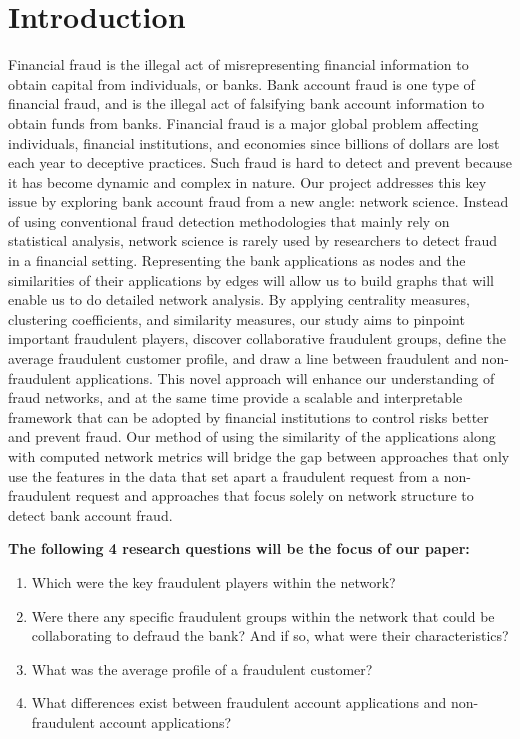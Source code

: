 \documentclass{styles/svproc}
\begin{document}
\section{Introduction}
Financial fraud is the illegal act of misrepresenting financial information to obtain capital from individuals, or banks.  Bank account fraud is one type of financial fraud, and is the illegal act of falsifying bank account information to obtain funds from banks. Financial fraud is a major global problem affecting individuals, financial institutions, and economies since billions of dollars are lost each year to deceptive practices. Such fraud is hard to detect and prevent because it has become dynamic and complex in nature. Our project addresses this key issue by exploring bank account fraud from a new angle: network science. Instead of using conventional fraud detection methodologies that mainly rely on statistical analysis, network science is rarely used by researchers to detect fraud in a financial setting. Representing the bank applications as nodes and the similarities of their applications by edges will allow us to build graphs that will enable us to do detailed network analysis. By applying centrality measures, clustering coefficients, and similarity measures, our study aims to pinpoint important fraudulent players, discover collaborative fraudulent groups, define the average fraudulent customer profile, and draw a line between fraudulent and non-fraudulent applications. This novel approach will enhance our understanding of fraud networks, and at the same time provide a scalable and interpretable framework that can be adopted by financial institutions to control risks better and prevent fraud. Our method of using the similarity of the applications along with computed network metrics will bridge the gap between approaches that only use the features in the data that set apart a fraudulent request from a non-fraudulent request and approaches that focus solely on network structure to detect bank account fraud.

\bigskip
\noindent\textbf{The following 4 research questions will be the focus of our paper:}

\begin{enumerate}
  \item Which were the key fraudulent players within the network?
  \item Were there any specific fraudulent groups within the network that could be collaborating to defraud the bank? And if so, what were their characteristics?
  \item What was the average profile of a fraudulent customer?
  \item What differences exist between fraudulent account applications and non-fraudulent account applications?
\end{enumerate}
\end{document}
